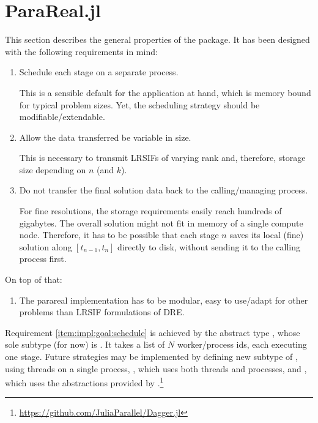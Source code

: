 \section{ParaReal.jl}
\label{sec:impl:pr}

This section describes the general properties of the  package.
It has been designed with the following requirements in mind:
\begin{enumerate}
  \item\label{item:impl:goal:schedule}
    Schedule each stage on a separate process.

    This is a sensible default for the application at hand,
    which is memory bound for typical problem sizes.
    Yet, the scheduling strategy should be modifiable/extendable.
  \item\label{item:impl:goal:variablesize}
    Allow the data transferred be variable in size.

    This is necessary to transmit \acp{LRSIF} of varying rank and, therefore, storage size depending on $n$ (and $k$).
  \item\label{item:impl:goal:notransfer}
    Do not transfer the final solution data back to the calling/managing process.

    For fine resolutions, the storage requirements easily reach hundreds of gigabytes.
    The overall solution might not fit in memory of a single compute node.
    Therefore, it has to be possible that each stage $n$ saves its local (fine) solution along $[t_{n-1},t_n]$ directly to disk,
    without sending it to the calling process first.
\end{enumerate}
On top of that:
\begin{enumerate}[resume]
  \item\label{item:impl:goal:modularity}
    The parareal implementation has to be modular,
    \ie easy to use/adapt for other problems than \ac{LRSIF} formulations of \ac{DRE}.
\end{enumerate}

Requirement \ref{item:impl:goal:schedule} is achieved by the abstract type ,
whose sole subtype (for now) is .
It takes a list of $N$ worker/process ids, each executing one stage.
Future strategies may be implemented by defining new subtype of , \eg
{} using threads on a single process,
, which uses both threads and processes, and
, which uses the abstractions provided by .\footnote{\url{https://github.com/JuliaParallel/Dagger.jl}}

